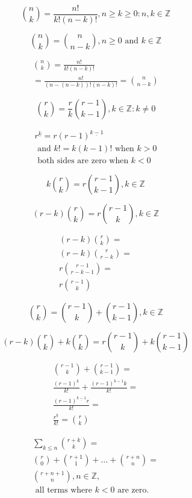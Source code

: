 \documentclass[10pt,a4paper,titlepage,twoside,draft]{article}
\theoremstyle{plain}
\theoremstyle{definition}
\theoremstyle{remark}
\begin{document}
\[\binom{n}{k} = \frac{n!}{k!(n-k)!}, n \geq k \geq 0 : n,k \in \mathbb{Z}\]

\[\binom{n}{k} = \binom{n}{n-k}, n \geq 0 \text{ and } k \in \mathbb{Z}\]

\begin{eqnarray}
\binom{n}{k} = \frac{n!}{k!(n-k)!} \\
= \frac{n!}{(n-(n-k))!(n-k)!} = \binom{n}{n-k}
\end{eqnarray}

\[\binom{r}{k} = \frac{r}{k}\binom{r-1}{k-1}, k \in \mathbb{Z} : k \neq 0\]

\begin{eqnarray}
r^{\underline{k}} = r(r-1)^{\underline{k-1}}  \\
\text{ and } k! = k(k-1)! \text{ when } k > 0 \\ 
\text{ both sides are zero when }  k < 0
\end{eqnarray}

\[k\binom{r}{k} = r\binom{r-1}{k-1}, k \in \mathbb{Z}\]

\[(r-k)\binom{r}{k} = r\binom{r-1}{k}, k \in \mathbb{Z} \]

\begin{eqnarray}
(r-k)\binom{r}{k} = \\
(r-k)\binom{r}{r-k} = \\
r\binom{r-1}{r-k-1} = \\
r\binom{r-1}{k}
\end{eqnarray}

\[\binom{r}{k} = \binom{r-1}{k} + \binom{r-1}{k-1}, k \in \mathbb{Z}\]

\[(r-k)\binom{r}{k} + k\binom{r}{k} = r \binom{r-1}{k} + k \binom{r-1}{k-1}\]

\bigskip

\begin{eqnarray}
\binom{r-1}{k} + \binom{r-1}{k-1} = \\
 \frac{(r-1)^{\underline{k}}}{k!} + \frac{(r-1)^{\underline{k-1}} k}{k!} = \\
 \frac{(r-1)^{\underline{k-1}} r}{k!} = \\
 \frac{r^{\underline{k}}}{k!} = \binom{r}{k}
\end{eqnarray}

\begin{eqnarray}
 \sum_{k \leq n} \binom{r+k}{k} = \\
 \binom{r}{0} + \binom{r+1}{1} + \ldots + \binom{r+n}{n} = \\
 \binom{r+n+1}{n}, n \in \mathbb{Z}, \\
 \text{ all terms where } k <0 \text{ are zero.}
\end{eqnarray}
\end{document}
